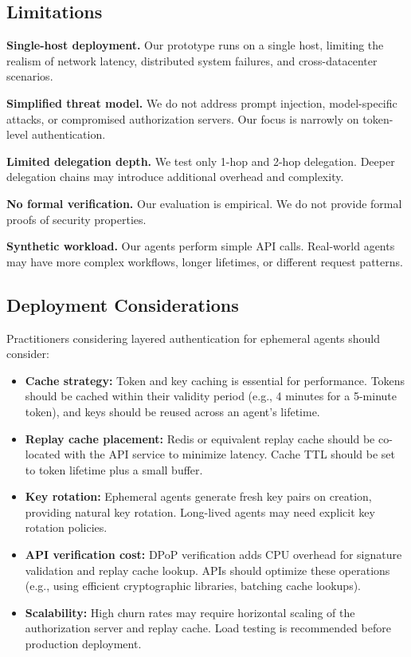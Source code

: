 \documentclass[conference,10pt]{IEEEtran}
\begin{document}
\subsection{Limitations}

\textbf{Single-host deployment.} Our prototype runs on a single host, limiting the realism of network latency, distributed system failures, and cross-datacenter scenarios.

\textbf{Simplified threat model.} We do not address prompt injection, model-specific attacks, or compromised authorization servers. Our focus is narrowly on token-level authentication.

\textbf{Limited delegation depth.} We test only 1-hop and 2-hop delegation. Deeper delegation chains may introduce additional overhead and complexity.

\textbf{No formal verification.} Our evaluation is empirical. We do not provide formal proofs of security properties.

\textbf{Synthetic workload.} Our agents perform simple API calls. Real-world agents may have more complex workflows, longer lifetimes, or different request patterns.

\subsection{Deployment Considerations}

Practitioners considering layered authentication for ephemeral agents should consider:

\begin{itemize}
    \item \textbf{Cache strategy:} Token and key caching is essential for performance. Tokens should be cached within their validity period (e.g., 4 minutes for a 5-minute token), and keys should be reused across an agent's lifetime.
    \item \textbf{Replay cache placement:} Redis or equivalent replay cache should be co-located with the API service to minimize latency. Cache TTL should be set to token lifetime plus a small buffer.
    \item \textbf{Key rotation:} Ephemeral agents generate fresh key pairs on creation, providing natural key rotation. Long-lived agents may need explicit key rotation policies.
    \item \textbf{API verification cost:} DPoP verification adds CPU overhead for signature validation and replay cache lookup. APIs should optimize these operations (e.g., using efficient cryptographic libraries, batching cache lookups).
    \item \textbf{Scalability:} High churn rates may require horizontal scaling of the authorization server and replay cache. Load testing is recommended before production deployment.
\end{itemize}
\end{document}
